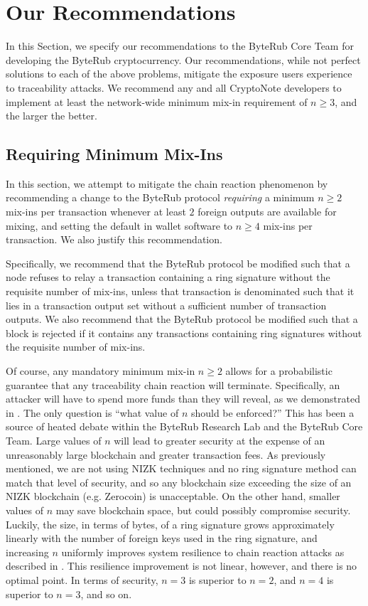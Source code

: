 \documentclass[12pt,english]{mrl}
\theoremstyle{definition}
\renewcommand{\geq}{\geqslant}
\numberwithin{equation}{section}
\numberwithin{figure}{section}
\numberwithin{equation}{section}
\numberwithin{equation}{section}
\numberwithin{figure}{section}
\begin{document}
\section{Our Recommendations}\label{Recommendations}

In this Section, we specify our recommendations to the ByteRub Core Team for developing the ByteRub cryptocurrency. Our recommendations, while not perfect solutions to each of the above problems, mitigate the exposure users experience to traceability attacks. We recommend any and all CryptoNote developers to implement at least the network-wide minimum mix-in requirement of $n\geq 3$, and the larger the better.

\subsection{Requiring Minimum Mix-Ins}\label{minMixIn}

In this section, we attempt to mitigate the chain reaction phenomenon by recommending a change to the ByteRub protocol \textit{requiring} a minimum $n\geq 2$ mix-ins per transaction whenever at least $2$ foreign outputs are available for mixing, and setting the default in wallet software to $n\geq 4$ mix-ins per transaction. We also justify this recommendation. 

Specifically, we recommend that the ByteRub protocol be modified such that a node refuses to relay a transaction containing a ring signature without the requisite number of mix-ins, unless that transaction is denominated such that it lies in a transaction output set without a sufficient number of transaction outputs. We also recommend that the ByteRub protocol be modified such that a block is rejected if it contains any transactions containing ring signatures without the requisite number of mix-ins.

Of course, any mandatory minimum mix-in $n \geq 2$ allows for a probabilistic guarantee that any traceability chain reaction will terminate. Specifically, an attacker will have to spend more funds than they will reveal, as we demonstrated in \cite{chainReactions}. The only question is ``what value of $n$ should be enforced?'' This has been a source of heated debate within the ByteRub Research Lab and the ByteRub Core Team. Large values of $n$ will lead to greater security at the expense of an unreasonably large blockchain and greater transaction fees. As previously mentioned, we are not using NIZK techniques and no ring signature method can match that level of security, and so any blockchain size exceeding the size of an NIZK blockchain (e.g. Zerocoin) is unacceptable. On the other hand, smaller values of $n$ may save blockchain space, but could possibly compromise security. Luckily, the size, in terms of bytes, of a ring signature grows approximately linearly with the number of foreign keys used in the ring signature, and increasing $n$ uniformly improves system resilience to chain reaction attacks as described in \cite{chainReactions}. This resilience improvement is not linear, however, and there is no optimal point. In terms of security, $n=3$ is superior to $n=2$, and $n=4$ is superior to $n=3$, and so on.
\end{document}

